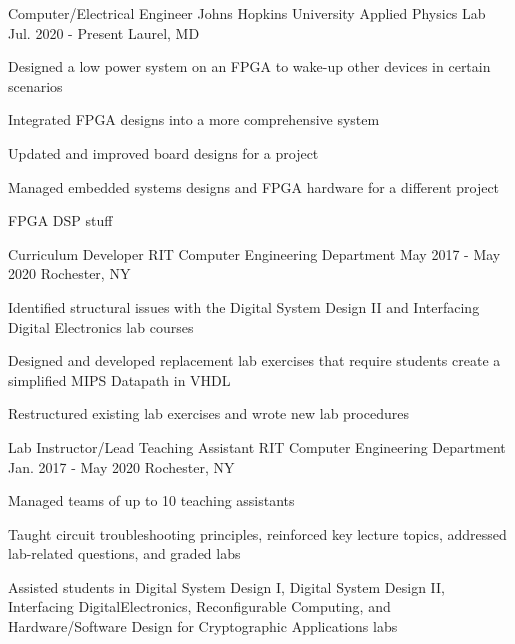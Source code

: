 
\begin{cvexperiences}

	\cvexperience
		{Computer/Electrical Engineer}
		{Johns Hopkins University Applied Physics Lab}
		{Jul. 2020 - Present}
		{Laurel, MD}
		{
			\begin{cvitems}
			\item {Designed a low power system on an FPGA to wake-up other devices in certain scenarios}
			\item {Integrated FPGA designs into a more comprehensive system}
			\item {Updated and improved board designs for a project}
			\item {Managed embedded systems designs and FPGA hardware for a different project}
			\item {FPGA DSP stuff}
			\end{cvitems}
		}

	\cvexperience
		{Curriculum Developer}
		{RIT Computer Engineering Department}
		{May 2017 - May 2020}
		{Rochester, NY}
		{
			\begin{cvitems}
			\item {Identified structural issues with the Digital System Design II and Interfacing Digital Electronics lab courses}
			\item {Designed and developed replacement lab exercises that require students create a simplified MIPS Datapath in VHDL}
			\item {Restructured existing lab exercises and wrote new lab procedures}
			\end{cvitems}
		}

	\cvexperience
		{Lab Instructor/Lead Teaching Assistant}
		{RIT Computer Engineering Department}
		{Jan. 2017 - May 2020}
		{Rochester, NY}
		{
			\begin{cvitems}
			\item{Managed teams of up to 10 teaching assistants}
			\item{Taught circuit troubleshooting principles, reinforced key lecture topics, addressed lab-related questions, and graded labs}
			\item{Assisted students in Digital System Design I, Digital System Design II, Interfacing Digital\linebreak Electronics, Reconfigurable Computing, and Hardware/Software Design for Cryptographic Applications labs}
			\end{cvitems}
		}


\end{cvexperiences}
